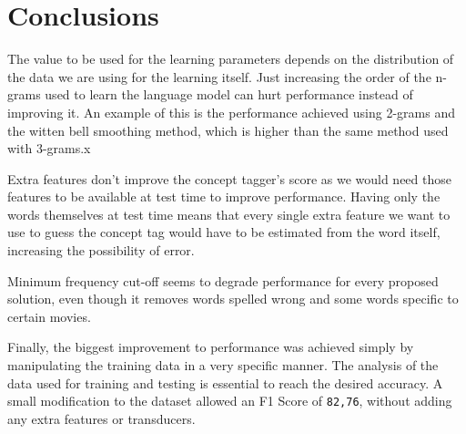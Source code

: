 \documentclass[11pt,a4paper]{article}
\begin{document}
\section{Conclusions}
The value to be used for the learning parameters depends on the distribution of the data we are using for the learning itself. Just increasing the order of the n-grams used to learn the language model can hurt performance instead of improving it. An example of this is the performance achieved using 2-grams and the witten bell smoothing method, which is higher than the same method used with 3-grams.x

Extra features don't improve the concept tagger's score as we would need those features to be available at test time to improve performance. Having only the words themselves at test time means that every single extra feature we want to use to guess the concept tag would have to be estimated from the word itself, increasing the possibility of error.

Minimum frequency cut-off seems to degrade performance for every proposed solution, even though it removes words spelled wrong and some words specific to certain movies.

Finally, the biggest improvement to performance was achieved simply by manipulating the training data in a very specific manner. The analysis of the data used for training and testing is essential to reach the desired accuracy. A small modification to the dataset allowed an F1 Score of \verb|82,76|, without adding any extra features or transducers.






%
%



\appendix
\end{document}
